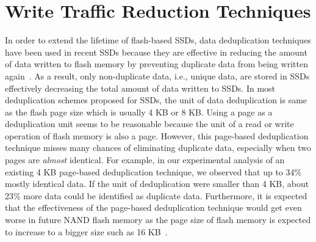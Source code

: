 \section{Write Traffic Reduction Techniques}
In order to extend the lifetime of flash-based SSDs,
data deduplication techniques have been used in recent SSDs
because they are effective in reducing the amount of data written to flash memory by preventing duplicate data from being written again~\cite{caftl,value-locality}.
As a result, only non-duplicate data, i.e., unique data, are stored in SSDs effectively decreasing the total amount of data written to
SSDs.
In most deduplication schemes proposed for SSDs,
the unit of data deduplication is same as the flash page size which is usually 4 KB or 8 KB.
Using a page as a deduplication unit seems to be reasonable 
because the unit of a read or write operation of flash memory is also a page. 
However, this page-based deduplication technique misses many chances of eliminating duplicate data, especially
when two pages are \textit{almost} identical.
For example, in our experimental analysis of an existing 4 KB page-based deduplication technique, we observed that
up to 34\% mostly identical data.
If the unit of deduplication were smaller than 4 KB, about 23\% more data could be identified as duplicate data.
Furthermore, it is expected that the effectiveness of the page-based deduplication technique would 
get even worse in future NAND flash memory as the page size of 
flash memory is expected to increase
to a bigger size such as 16 KB~\cite{16kpage}.


